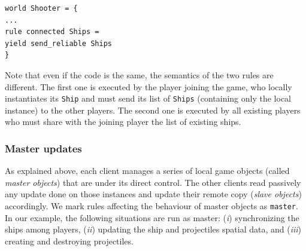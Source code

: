 \begin{lstlisting}
world Shooter = {
...
rule connected Ships =
yield send_reliable Ships
}
\end{lstlisting}

Note that even if the code is the same, the semantics of the two rules are different. The first one is executed by the player joining the game, who locally instantiates its \texttt{Ship} and must send its list of \texttt{Ships} (containing only the local instance) to the other players. The second one is executed by all existing players who must share with the joining player the list of existing ships.


\subsubsection{Master updates}
As explained above, each client manages a series of local game objects (called \textit{master objects}) that are under its direct control. The other clients read passively any update done on those instances and update their remote copy  (\textit{slave objects}) accordingly. We mark rules affecting the behaviour of master objects as \texttt{master}. In our example, the following situations are run as master: (\textit{i}) synchronizing the ships among players, (\textit{ii}) updating the ship and projectiles spatial data, and (\textit{iii}) creating and destroying projectiles.


